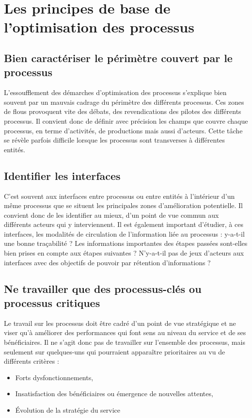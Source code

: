 \section{Les principes de base de l’optimisation des processus}
\subsection{Bien caractériser le périmètre couvert par le processus}

L'essoufflement des démarches d'optimisation des processus s'explique bien souvent par un mauvais cadrage du périmètre des différents processus. Ces zones de flous provoquent vite des débats, des revendications des pilotes des différents processus. Il convient donc de définir avec précision les champs que couvre chaque processus, en terme d'activités, de productions mais aussi d'acteurs. Cette tâche se révèle parfois difficile lorsque les processus sont transverses à différentes entités. 
\subsection{Identifier les interfaces }
C'est souvent aux interfaces entre processus ou entre entités à l'intérieur d'un même processus que se situent les principales zones d'amélioration potentielle. Il convient donc de les identifier au mieux, d'un point de vue commun aux différents acteurs qui y interviennent. Il est également important d'étudier, à ces interfaces, les modalités de circulation de l'information liée au processus : y-a-t-il une bonne traçabilité ? Les informations importantes des étapes passées sont-elles bien prises en compte aux étapes suivantes ? N'y-a-t-il pas de jeux d'acteurs aux interfaces avec des objectifs de pouvoir par rétention d'informations ?
\subsection{Ne travailler que des processus-clés ou processus critiques  }
Le travail sur les processus doit être cadré d'un point de vue stratégique et ne viser qu'à améliorer des performances qui font sens au niveau du service et de ses bénéficiaires. Il ne s'agit donc pas de travailler sur l'ensemble des processus, mais seulement sur quelques-uns qui pourraient apparaître prioritaires au vu de différents critères : 
\begin{itemize}[label=\textbullet, font=\LARGE \color{blue}]
	\item Forts dysfonctionnements,
	\item Insatisfaction des bénéficiaires ou émergence de nouvelles attentes,
	\item Évolution de la stratégie du service
\end{itemize}
